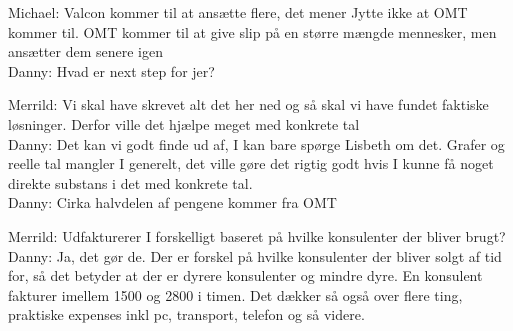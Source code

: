 Michael: Valcon kommer til at ansætte flere, det mener Jytte ikke at OMT kommer til. OMT kommer til at give slip på en større mængde mennesker, men ansætter dem senere igen\\
Danny: Hvad er next step for jer?

Merrild: Vi skal have skrevet alt det her ned og så skal vi have fundet faktiske løsninger. Derfor ville det hjælpe meget med konkrete tal\\
Danny: Det kan vi godt finde ud af, I kan bare spørge Lisbeth om det. Grafer og reelle tal mangler I generelt, det ville gøre det rigtig godt hvis I kunne få noget direkte substans i det med konkrete tal.\\
Danny: Cirka halvdelen af pengene kommer fra OMT

Merrild: Udfakturerer I forskelligt baseret på hvilke konsulenter der bliver brugt?\\
Danny: Ja, det gør de. Der er forskel på hvilke konsulenter der bliver solgt af tid for, så det betyder at der er dyrere konsulenter og mindre dyre. En konsulent fakturer imellem 1500 og 2800 i timen. Det dækker så også over flere ting, praktiske expenses inkl pc, transport, telefon og så videre.


